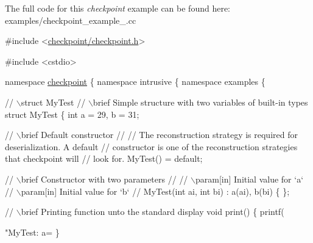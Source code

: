 The full code for this {\itshape checkpoint} example can be found here\+: {\ttfamily examples/checkpoint\+\_\+example\+\_.\+cc}


\begin{DoxyCodeInclude}

\textcolor{preprocessor}{#include <\hyperlink{checkpoint_8h}{checkpoint/checkpoint.h}>}

\textcolor{preprocessor}{#include <cstdio>}

\textcolor{keyword}{namespace }\hyperlink{namespacecheckpoint}{checkpoint} \{ \textcolor{keyword}{namespace }intrusive \{ \textcolor{keyword}{namespace }examples \{

\textcolor{comment}{// \(\backslash\)struct MyTest}
\textcolor{comment}{// \(\backslash\)brief Simple structure with two variables of built-in types}
\textcolor{keyword}{struct }MyTest \{
  \textcolor{keywordtype}{int} a = 29, b = 31;

  \textcolor{comment}{// \(\backslash\)brief Default constructor}
  \textcolor{comment}{//}
  \textcolor{comment}{// The reconstruction strategy is required for deserialization. A default}
  \textcolor{comment}{// constructor is one of the reconstruction strategies that checkpoint will}
  \textcolor{comment}{// look for.}
  MyTest() = \textcolor{keywordflow}{default};

  \textcolor{comment}{// \(\backslash\)brief Constructor with two parameters}
  \textcolor{comment}{//}
  \textcolor{comment}{// \(\backslash\)param[in] Initial value for `a`}
  \textcolor{comment}{// \(\backslash\)param[in] Initial value for `b`}
  \textcolor{comment}{//}
  MyTest(\textcolor{keywordtype}{int} ai, \textcolor{keywordtype}{int} bi) : a(ai), b(bi) \{ \};

  \textcolor{comment}{// \(\backslash\)brief Printing function unto the standard display}
  \textcolor{keywordtype}{void} print() \{
    printf(\textcolor{stringliteral}{"MyTest: a=%
  \}

}
\end{DoxyCodeInclude}
